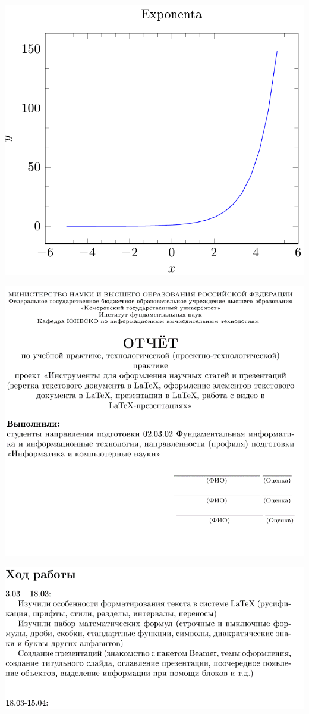 \documentclass{article}
\begin{document}
	\includegraphics{13}
	
	\includegraphics{14}
	
	\includegraphics{15}
	
\end{document}
